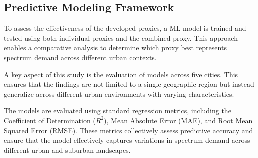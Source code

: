 \documentclass[conference]{IEEEtran}
\begin{document}

\subsection{Predictive Modeling Framework}

To assess the effectiveness of the developed proxies, a ML model is trained and tested using both individual proxies and the combined proxy. This approach enables a comparative analysis to determine which proxy best represents spectrum demand across different urban contexts.

A key aspect of this study is the evaluation of models across five cities. This ensures that the findings are not limited to a single geographic region but instead generalize across different urban environments with varying characteristics.


The models are evaluated using standard regression metrics, including the Coefficient of Determination (\(R^2\)), Mean Absolute Error (MAE), and Root Mean Squared Error (RMSE). These metrics collectively assess predictive accuracy and ensure that the model effectively captures variations in spectrum demand across different urban and suburban landscapes.


\end{document}
